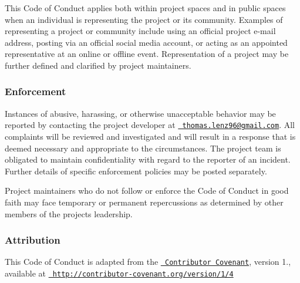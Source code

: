 This Code of Conduct applies both within project spaces and in public spaces when an individual is representing the project or its community. Examples of representing a project or community include using an official project e-\/mail address, posting via an official social media account, or acting as an appointed representative at an online or offline event. Representation of a project may be further defined and clarified by project maintainers.

\subsubsection*{Enforcement}

Instances of abusive, harassing, or otherwise unacceptable behavior may be reported by contacting the project developer at \href{mailto:thomas.lenz96@gmail.com}{\texttt{ thomas.\+lenz96@gmail.\+com}}. All complaints will be reviewed and investigated and will result in a response that is deemed necessary and appropriate to the circumstances. The project team is obligated to maintain confidentiality with regard to the reporter of an incident. Further details of specific enforcement policies may be posted separately.

Project maintainers who do not follow or enforce the Code of Conduct in good faith may face temporary or permanent repercussions as determined by other members of the project\textquotesingle{}s leadership.

\subsubsection*{Attribution}

This Code of Conduct is adapted from the \href{http://contributor-covenant.org}{\texttt{ Contributor Covenant}}, version 1., available at \href{http://contributor-covenant.org/version/1/4/}{\texttt{ http\+://contributor-\/covenant.\+org/version/1/4}} 